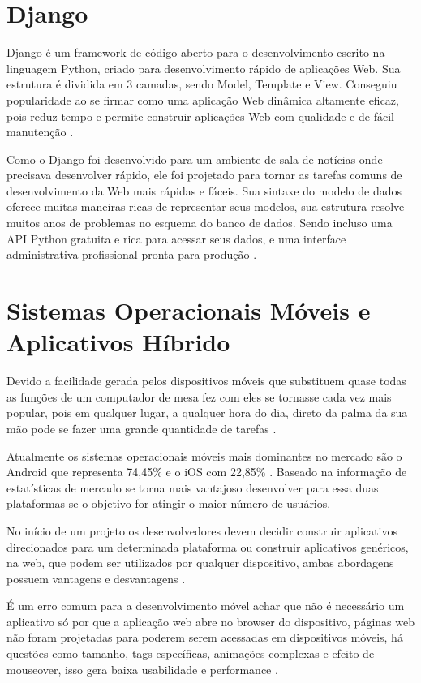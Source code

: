 \documentclass{ifto-tex}
\begin{document}
	
	\section{Django}
Django é um framework de código aberto para o desenvolvimento escrito na linguagem Python, criado para desenvolvimento rápido de aplicações Web.  Sua estrutura é dividida em 3 camadas, sendo Model, Template e View. Conseguiu popularidade ao se firmar como uma aplicação Web dinâmica altamente eficaz, pois reduz tempo e permite construir aplicações Web com qualidade e de fácil manutenção \cite{badindesenvolvimento}.

Como o Django foi desenvolvido para um ambiente de sala de notícias onde precisava desenvolver rápido, ele foi projetado para tornar as tarefas comuns de desenvolvimento da Web mais rápidas e fáceis. Sua sintaxe do modelo de dados oferece muitas maneiras ricas de representar seus modelos, sua estrutura resolve muitos anos de problemas no esquema do banco de dados. Sendo incluso uma API Python gratuita e rica para acessar seus dados, e uma interface administrativa profissional pronta para produção \cite{Djangoem92:online}.

	
	\section{Sistemas Operacionais Móveis e Aplicativos Híbrido}
	Devido a facilidade gerada pelos dispositivos móveis que substituem quase todas as funções de um computador de mesa fez com eles se tornasse cada vez mais popular, pois em qualquer lugar, a qualquer hora do dia, direto da palma da sua mão pode se fazer uma grande quantidade de tarefas \cite{Sistemas41:online}.
	
	Atualmente os sistemas operacionais móveis mais dominantes no mercado são o Android que representa 74,45\% e o iOS com 22,85\% \cite{iOSvsAnd26:online}. Baseado na informação de estatísticas de mercado se torna mais vantajoso desenvolver para essa duas plataformas se o objetivo for atingir o maior número de usuários.
	
	No início de um projeto os desenvolvedores devem decidir construir aplicativos direcionados para um determinada plataforma ou construir aplicativos genéricos, na web, que podem ser utilizados por qualquer dispositivo, ambas abordagens possuem vantagens e desvantagens \cite{Aplicaco50:online}.
	
	É um erro comum para a desenvolvimento móvel achar que não é necessário um aplicativo só por que a aplicação web abre no browser do dispositivo, páginas web não foram projetadas para poderem serem acessadas em dispositivos móveis, há questões como tamanho, tags específicas, animações complexas e efeito de mouseover, isso gera baixa usabilidade e performance \cite{Introduc9:online}.
	
\end{document}
